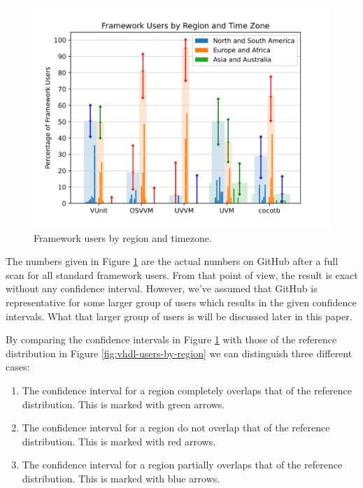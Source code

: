 \documentclass[]{article}
\providecommand{\tightlist}{%
  \setlength{\itemsep}{0pt}\setlength{\parskip}{0pt}}
\begin{document}
\begin{figure}

{\centering \includegraphics[width=1\linewidth]{img/framework_timezone_chart} 

}

\caption{Framework users by region and timezone.}\label{fig:framework-users-by-region}
\end{figure}

The numbers given in Figure \ref{fig:framework-users-by-region} are the actual numbers on GitHub after a full scan for all standard framework users. From that point of view, the result is exact without any confidence interval. However, we've assumed that GitHub is representative for some larger group of users which results in the given confidence intervals. What that larger group of users is will be discussed later in this paper.

By comparing the confidence intervals in Figure \ref{fig:framework-users-by-region} with those of the reference distribution in Figure \ref{fig:vhdl-users-by-region} we can distinguish three different cases:

\begin{enumerate}
\def\labelenumi{\arabic{enumi}.}
\tightlist
\item
  The confidence interval for a region completely overlaps that of the reference distribution. This is marked with green arrows.
\item
  The confidence interval for a region do not overlap that of the reference distribution. This is marked with red arrows.
\item
  The confidence interval for a region partially overlaps that of the reference distribution. This is marked with blue arrows.
\end{enumerate}
\end{document}
